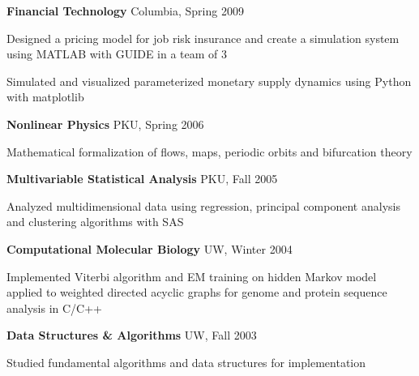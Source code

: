 \documentclass[margin,line]{resume}
\begin{document}
\begin{resume}
    \textbf{Financial Technology} \hfill Columbia, Spring 2009 \vspace{-3mm}\\\vspace{-1mm}%
      \begin{list2}
      \item Designed a pricing model for job risk insurance and create a simulation system using MATLAB with GUIDE in a team of 3 
      \item Simulated and visualized parameterized monetary supply dynamics using Python with matplotlib 
      \end{list2}

    \textbf{Nonlinear Physics} \hfill PKU, Spring 2006  \vspace{-3mm}\\\vspace{-1mm}%
      \begin{list2}
      \item Mathematical formalization of flows, maps, periodic orbits and bifurcation theory 
      \end{list2}

    \textbf{Multivariable Statistical Analysis} \hfill PKU, Fall 2005  \vspace{-3mm}\\\vspace{-1mm}%
      \begin{list2}
       \item Analyzed multidimensional data using regression, principal component analysis and clustering algorithms with SAS
      \end{list2}

    \textbf{Computational Molecular Biology} \hfill UW, Winter 2004  \vspace{-3mm}\\\vspace{-1mm}%
      \begin{list2}
      \item Implemented Viterbi algorithm and EM training on hidden Markov model applied to weighted directed acyclic graphs for genome and protein sequence analysis in C/C++ 
      \end{list2}

      

    \textbf{Data Structures \& Algorithms} \hfill UW, Fall 2003 \vspace{-3mm}\\\vspace{-1mm}%
      \begin{list2}
      \item Studied fundamental algorithms and data structures for implementation 
      \end{list2}


\end{resume}
\end{document}
